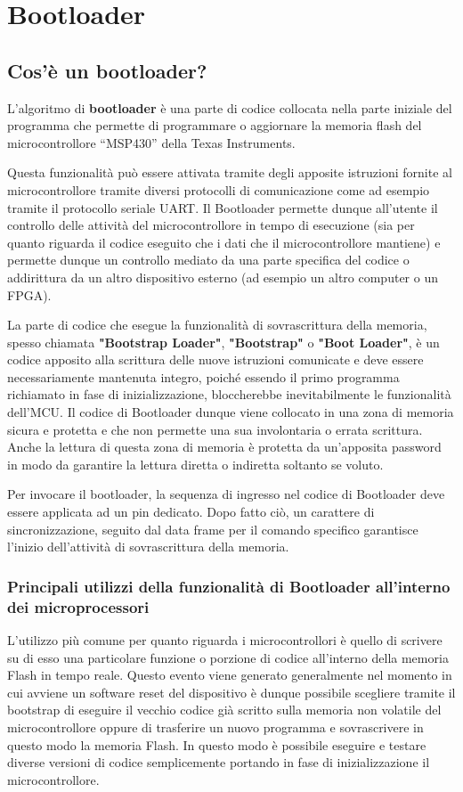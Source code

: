 \documentclass[LaM,binding=0.6cm]{../sapthesis}
\begin{document}
\chapter{Bootloader}

\section{Cos'è un bootloader?}

L'algoritmo di \textbf{bootloader} è una parte di codice collocata nella parte iniziale del programma che permette di programmare o aggiornare la memoria flash del microcontrollore “MSP430” della Texas Instruments.

Questa funzionalità può essere attivata tramite degli apposite istruzioni fornite al microcontrollore tramite diversi protocolli di comunicazione come ad esempio tramite il protocollo seriale UART. 
Il Bootloader permette dunque all’utente il controllo delle attività del microcontrollore in tempo di esecuzione (sia per quanto riguarda il codice eseguito che i dati che il microcontrollore mantiene) e permette dunque un controllo mediato da una parte specifica del codice o addirittura da un altro dispositivo esterno (ad esempio un altro computer o un FPGA).

La parte di codice che esegue la funzionalità di sovrascrittura della memoria, spesso chiamata  \textbf{"Bootstrap Loader"},  \textbf{"Bootstrap"} o  \textbf{"Boot Loader"}, è un codice apposito alla scrittura delle nuove istruzioni comunicate e deve essere necessariamente mantenuta integro, poiché essendo il primo programma richiamato in fase di inizializzazione, bloccherebbe inevitabilmente le funzionalità dell'MCU. Il codice di Bootloader dunque viene collocato in una zona di memoria sicura e protetta e che non permette una sua involontaria o errata scrittura. Anche la lettura di questa zona di memoria è protetta da un'apposita password in modo da garantire la lettura diretta o indiretta soltanto se voluto.

Per invocare il bootloader, la sequenza di ingresso nel codice di Bootloader deve essere applicata ad un pin dedicato. Dopo fatto ciò, un carattere di sincronizzazione, seguito dal data frame per il comando specifico garantisce l’inizio dell’attività di sovrascrittura della memoria.


\subsection{Principali utilizzi della funzionalità di Bootloader all'interno dei microprocessori}
L'utilizzo più comune per quanto riguarda i microcontrollori è quello di scrivere su di esso una particolare funzione o porzione di codice all'interno della memoria Flash in tempo reale.
Questo evento viene generato generalmente nel momento in cui avviene un software reset del dispositivo è dunque possibile scegliere tramite il bootstrap di eseguire il vecchio codice già scritto sulla memoria non volatile del microcontrollore oppure di trasferire un nuovo programma e sovrascrivere in questo modo la memoria Flash. In questo modo è possibile eseguire e testare diverse versioni di codice semplicemente portando in fase di inizializzazione il microcontrollore.
\end{document}
